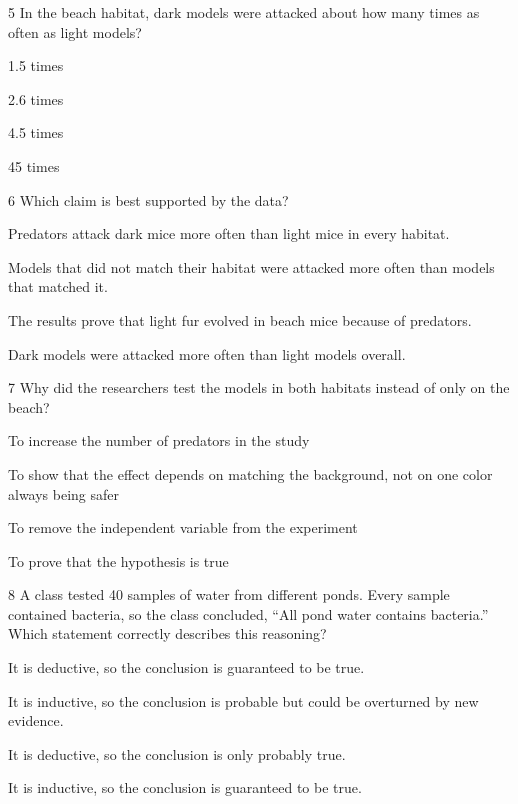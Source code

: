 \documentclass[11pt,letterpaper]{article}
\begin{document}
\begin{mcq}{5}
In the beach habitat, dark models were attacked about how many times as often as light models?
\begin{choices}
  \item 1.5 times
  \item 2.6 times
  \item 4.5 times
  \item 45 times
\end{choices}
\end{mcq}

\begin{mcq}{6}
Which claim is best supported by the data?
\begin{choices}
  \item Predators attack dark mice more often than light mice in every habitat.
  \item Models that did not match their habitat were attacked more often than models that matched it.
  \item The results prove that light fur evolved in beach mice because of predators.
  \item Dark models were attacked more often than light models overall.
\end{choices}
\end{mcq}

\begin{mcq}{7}
Why did the researchers test the models in both habitats instead of only on the beach?
\begin{choices}
  \item To increase the number of predators in the study
  \item To show that the effect depends on matching the background, not on one color always being safer
  \item To remove the independent variable from the experiment
  \item To prove that the hypothesis is true
\end{choices}
\end{mcq}


\begin{mcq}{8}
A class tested 40 samples of water from different ponds. Every sample contained bacteria, so the class concluded, ``All pond water contains bacteria.'' Which statement correctly describes this reasoning?
\begin{choices}
  \item It is deductive, so the conclusion is guaranteed to be true.
  \item It is inductive, so the conclusion is probable but could be overturned by new evidence.
  \item It is deductive, so the conclusion is only probably true.
  \item It is inductive, so the conclusion is guaranteed to be true.
\end{choices}
\end{mcq}
\end{document}
